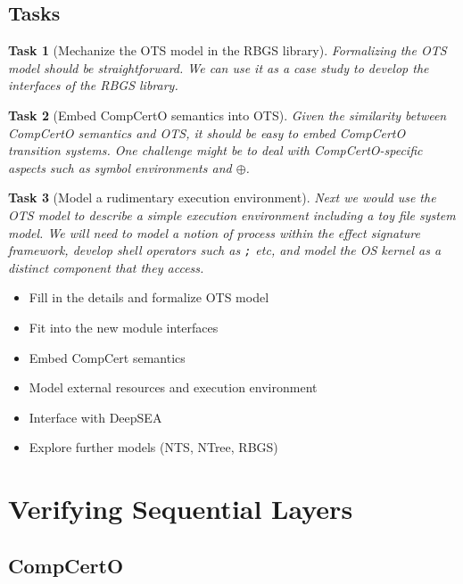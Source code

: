 \documentclass{report}
\newtheorem{task}{Task}[chapter]
\begin{document}

\section{Tasks} %

\begin{task}[Mechanize the OTS model in the RBGS library]
Formalizing the OTS model should be straightforward.
We can use it as a case study to develop the interfaces of the RBGS library.
\end{task}

\begin{task}[Embed CompCertO semantics into OTS]
Given the similarity between CompCertO semantics and OTS,
it should be easy to embed CompCertO transition systems.
One challenge might be to deal with CompCertO-specific aspects
such as symbol environments and $\oplus$.
\end{task}

\begin{task}[Model a rudimentary execution environment]
Next we would use the OTS model to describe a simple execution environment
including a toy file system model.
We will need to model a notion of process within the effect signature framework,
develop shell operators such as \texttt{;} etc, and
model the OS kernel as a distinct component that they access.
\end{task}

\begin{itemize}
\item Fill in the details and formalize OTS model
\item Fit into the new module interfaces
\item Embed CompCert semantics
\item Model external resources and execution environment
\item Interface with DeepSEA
\item Explore further models (NTS, NTree, RBGS)
\end{itemize}




\newpage
\chapter{Verifying Sequential Layers} %

\section{CompCertO}
\end{document}
